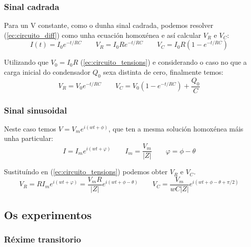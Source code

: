 \documentclass[12pt, a4paper, titlepage]{article}
\begin{document}
      \subsubsection{Sinal cadrada}

        Para un V constante, como o dunha sinal cadrada, podemos resolver (\ref{ec:circuito_diff}) como unha ecuación homoxénea e así calcular $V_R$ e $V_C$:
        \begin{equation*}
          I(t) = I_0 e^{-t/RC} \qquad V_R = I_0 R e^{-t/RC} \qquad V_C = I_0 R (1 - e^{-t/RC})
        \end{equation*}

        Utilizando que $V_0 = I_0 R$ (\ref{ec:circuito_tensions}) e considerando o caso no que a carga inicial do condensador $Q_0$ sexa distinta de cero, finalmente temos:
        \begin{equation} \label{ec:tensiones_constantes}
          V_R = V_0 e^{-t/RC} \qquad V_C = V_0 (1 - e^{-t/RC}) + \frac{Q_0}{C}
        \end{equation}

      \subsubsection{Sinal sinusoidal}

        Neste caso temos $V = V_m e^{i(wt + \phi)}$, que ten a mesma solución homoxénea máis unha particular:
        \begin{equation*}
          I = I_m e^{i(wt + \varphi)} \qquad I_m = \frac{V_m}{|Z|} \qquad \varphi = \phi - \theta
        \end{equation*}

        Sustituíndo en (\ref{ec:circuito_tensions}) podemos obter $V_R$ e $V_C$.
        \begin{equation}
          V_R = R I_m e^{i(wt + \varphi)} = \frac{V_m R}{|Z|} e^{i(wt + \phi - \theta)} \qquad V_C = \frac{V_m}{wC|Z|} e^{i(wt + \phi - \theta + \pi / 2)}
        \end{equation}

      \subsection{Os experimentos}

      \subsubsection{Réxime transitorio}
      
\end{document}
